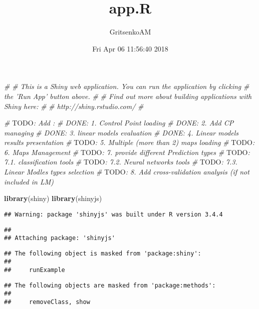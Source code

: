 \documentclass[]{article}
\title{app.R}
\author{GritsenkoAM}
\date{Fri Apr 06 11:56:40 2018}
\newenvironment{Shaded}{\begin{snugshade}}{\end{snugshade}}
\newcommand{\KeywordTok}[1]{\textcolor[rgb]{0.13,0.29,0.53}{\textbf{#1}}}
\newcommand{\CommentTok}[1]{\textcolor[rgb]{0.56,0.35,0.01}{\textit{#1}}}
\newcommand{\AlertTok}[1]{\textcolor[rgb]{0.94,0.16,0.16}{#1}}
\newcommand{\NormalTok}[1]{#1}
\begin{document}
\maketitle

\begin{Shaded}
\begin{Highlighting}[]
\CommentTok{#}
\CommentTok{# This is a Shiny web application. You can run the application by clicking}
\CommentTok{# the 'Run App' button above.}
\CommentTok{#}
\CommentTok{# Find out more about building applications with Shiny here:}
\CommentTok{#}
\CommentTok{#    http://shiny.rstudio.com/}
\CommentTok{#}


\CommentTok{# }\AlertTok{TODO}\CommentTok{: Add :}
\CommentTok{# DONE: 1. Control Point loading}
\CommentTok{# DONE: 2. Add CP managing}
\CommentTok{# DONE: 3. linear models evaluation}
\CommentTok{# DONE: 4. Linear models results presentation}
\CommentTok{# }\AlertTok{TODO}\CommentTok{: 5. Multiple (more than 2) maps loading }
\CommentTok{# }\AlertTok{TODO}\CommentTok{: 6. Maps Management}
\CommentTok{# }\AlertTok{TODO}\CommentTok{: 7. provide different Prediction types }
\CommentTok{# }\AlertTok{TODO}\CommentTok{: 7.1. classification tools}
\CommentTok{# }\AlertTok{TODO}\CommentTok{: 7.2. Neural networks tools}
\CommentTok{# }\AlertTok{TODO}\CommentTok{: 7.3. Linear Modles types selection}
\CommentTok{# }\AlertTok{TODO}\CommentTok{: 8. Add cross-validation analysis (if not included in LM)}



\KeywordTok{library}\NormalTok{(shiny)}
\KeywordTok{library}\NormalTok{(shinyjs)}
\end{Highlighting}
\end{Shaded}

\begin{verbatim}
## Warning: package 'shinyjs' was built under R version 3.4.4
\end{verbatim}

\begin{verbatim}
## 
## Attaching package: 'shinyjs'
\end{verbatim}

\begin{verbatim}
## The following object is masked from 'package:shiny':
## 
##     runExample
\end{verbatim}

\begin{verbatim}
## The following objects are masked from 'package:methods':
## 
##     removeClass, show
\end{verbatim}
\end{document}
